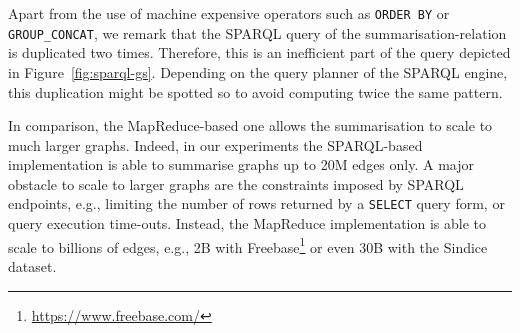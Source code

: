 Apart from the use of machine expensive operators such as \texttt{ORDER BY} or \texttt{GROUP\_CONCAT}, we remark that the SPARQL query of the \gls{summarisation-relation} is duplicated two times. Therefore, this is an inefficient part of the query depicted in Figure~\ref{fig:sparql-gs}. Depending on the query planner of the SPARQL engine, this duplication might be spotted so to avoid computing twice the same pattern.

In comparison, the MapReduce-based one allows the summarisation to scale to much larger graphs. Indeed, in our experiments the SPARQL-based implementation is able to summarise graphs up to 20M edges only. A major obstacle to scale to larger graphs are the constraints imposed by SPARQL endpoints, e.g., limiting the number of rows returned by a \texttt{SELECT} query form, or query execution time-outs. Instead, the MapReduce implementation is able to scale to billions of edges, e.g., 2B with Freebase\footnote{\url{https://www.freebase.com/}} or even 30B with the Sindice dataset.

